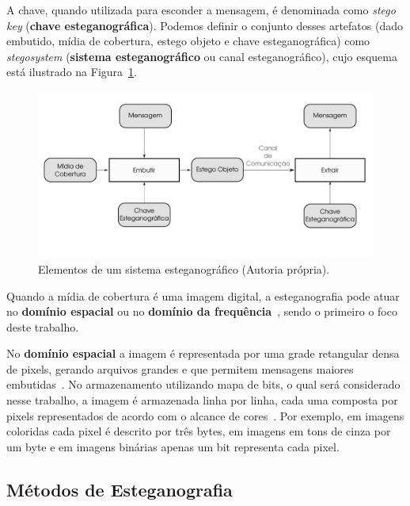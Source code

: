 A chave, quando utilizada para esconder a mensagem, é denominada como \textit{stego key} (\textbf{chave esteganográfica}). Podemos definir o conjunto desses artefatos (dado embutido, mídia de cobertura, estego objeto e chave esteganográfica) como \textit{stegosystem} (\textbf{sistema esteganográfico} ou canal esteganográfico), cujo esquema está ilustrado na Figura~\ref{fig:stegosystem}.

\begin{figure}[!htb]
	\centering
	\includegraphics[width=1\textwidth]{dados/figuras/stegosystem.pdf}
	\caption{Elementos de um sistema esteganográfico (Autoria própria).}
	\label{fig:stegosystem}
\end{figure}

Quando a mídia de cobertura é uma imagem digital, a esteganografia pode atuar no \textbf{domínio espacial} ou no \textbf{domínio da frequência}~\cite{fridrich2009steganography}, sendo o primeiro o foco deste trabalho.

No \textbf{domínio espacial} a imagem é representada por uma grade retangular densa de pixels,  %
gerando arquivos grandes e que permitem mensagens maiores embutidas~\cite{fridrich2009steganography}. No armazenamento utilizando mapa de bits, o qual será considerado nesse trabalho, a imagem é armazenada linha por linha, cada uma composta por pixels representados de acordo com o alcance de cores~\cite{cwayne1995graphicsfileformats}. Por exemplo, em imagens coloridas cada pixel é descrito por três bytes, em imagens em tons de cinza por um byte e em imagens binárias apenas um bit representa cada pixel.

\subsection{Métodos de Esteganografia}
\label{subsec:esteganografia-alg}

